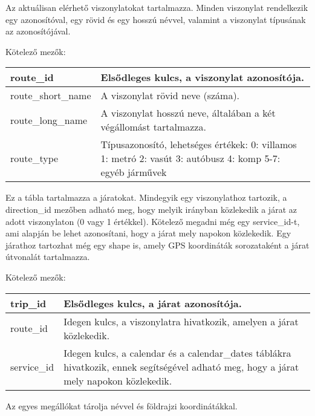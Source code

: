 
Az aktuálisan elérhető viszonylatokat tartalmazza. Minden viszonylat rendelkezik egy azonosítóval, egy rövid és egy hosszú névvel, valamint a viszonylat típusának az azonosítójával.

\medskip

\noindent Kötelező mezők:

\bigskip

\begin{tabular}{|p{3.5cm}|p{10cm}|}
\hline
route\_id & Elsődleges kulcs, a viszonylat azonosítója. \\
\hline
route\_short\_name & A viszonylat rövid neve (száma). \\
\hline
route\_long\_name & A viszonylat hosszú neve, általában a két végállomást tartalmazza. \\
\hline
route\_type & Típusazonosító, lehetséges értékek:
0: villamos
1: metró
2: vasút
3: autóbusz
4: komp
5-7: egyéb járművek \\
\hline
\end{tabular}


Ez a tábla tartalmazza a járatokat. Mindegyik egy viszonylathoz tartozik, a direction\_id mezőben adható meg, hogy melyik irányban közlekedik a járat az adott viszonylaton (0 vagy 1 értékkel). Kötelező megadni még egy service\_id-t, ami alapján be lehet azonosítani, hogy a járat mely napokon közlekedik. Egy járathoz tartozhat még egy shape is, amely GPS koordináták sorozataként a járat útvonalát tartalmazza.

\medskip

\noindent Kötelező mezők:

\bigskip

\begin{tabular}{|p{3cm}|p{10cm}|}
\hline
trip\_id & Elsődleges kulcs, a járat azonosítója. \\
\hline
route\_id & Idegen kulcs, a viszonylatra hivatkozik, amelyen a járat közlekedik. \\
\hline
service\_id & Idegen kulcs, a calendar és a calendar\_dates táblákra hivatkozik, ennek segítségével adható meg, hogy a járat mely napokon közlekedik. \\
\hline
\end{tabular}


Az egyes megállókat tárolja névvel és földrajzi koordinátákkal.

\medskip

